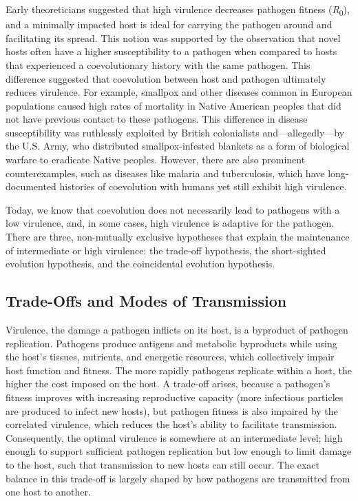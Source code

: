 \documentclass[
]{book}
\begin{document}
Early theoreticians suggested that high virulence decreases pathogen fitness (\emph{R}\textsubscript{0}), and a minimally impacted host is ideal for carrying the pathogen around and facilitating its spread. This notion was supported by the observation that novel hosts often have a higher susceptibility to a pathogen when compared to hosts that experienced a coevolutionary history with the same pathogen. This difference suggested that coevolution between host and pathogen ultimately reduces virulence. For example, smallpox and other diseases common in European populations caused high rates of mortality in Native American peoples that did not have previous contact to these pathogens. This difference in disease susceptibility was ruthlessly exploited by British colonialists and---allegedly---by the U.S. Army, who distributed smallpox-infested blankets as a form of biological warfare to eradicate Native peoples. However, there are also prominent counterexamples, such as diseases like malaria and tuberculosis, which have long-documented histories of coevolution with humans yet still exhibit high virulence.

Today, we know that coevolution does not necessarily lead to pathogens with a low virulence, and, in some cases, high virulence is adaptive for the pathogen. There are three, non-mutually exclusive hypotheses that explain the maintenance of intermediate or high virulence: the trade-off hypothesis, the short-sighted evolution hypothesis, and the coincidental evolution hypothesis.

\hypertarget{trade-offs-and-modes-of-transmission}{%
\subsection{Trade-Offs and Modes of Transmission}\label{trade-offs-and-modes-of-transmission}}

Virulence, the damage a pathogen inflicts on its host, is a byproduct of pathogen replication. Pathogens produce antigens and metabolic byproducts while using the host's tissues, nutrients, and energetic resources, which collectively impair host function and fitness. The more rapidly pathogens replicate within a host, the higher the cost imposed on the host. A trade-off arises, because a pathogen's fitness improves with increasing reproductive capacity (more infectious particles are produced to infect new hosts), but pathogen fitness is also impaired by the correlated virulence, which reduces the host's ability to facilitate transmission. Consequently, the optimal virulence is somewhere at an intermediate level; high enough to support sufficient pathogen replication but low enough to limit damage to the host, such that transmission to new hosts can still occur. The exact balance in this trade-off is largely shaped by how pathogens are transmitted from one host to another.
\end{document}
